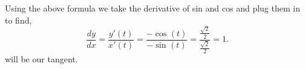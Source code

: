 Using the above formula we take the derivative of sin and cos and plug them in to find,
 \[
 \frac{ dy }{ dx } =\frac{ y'\left( t \right)  }{ x'\left( t \right)  }= \frac{ -\cos^{  } \left( t \right)  }{ -\sin^{  } \left( t \right)} = \frac{ \frac{ \sqrt{ 2 }  }{ 2 } }{ \frac{ \sqrt{ 2 }  }{ 2 } }= 1
.\] 
will be our tangent. 
